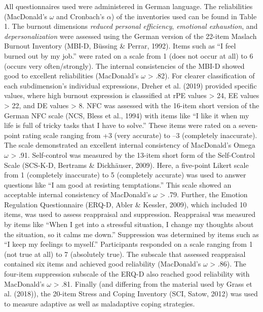\documentclass[
  man]{apa6}
\begin{document}
All questionnaires used were administered in German language.
The reliabilities (MacDonald's \(\omega\) and Cronbach's \(\alpha\)) of the inventories used can be found in Table 1.
The burnout dimensions \emph{reduced personal efficiency}, \emph{emotional exhaustion}, and \emph{depersonalization} were assessed using the German version of the 22-item Maslach Burnout Inventory (MBI-D, Büssing \& Perrar, 1992).
Items such as ``I feel burned out by my job.'' were rated on a scale from 1 (does not occur at all) to 6 (occurs very often/strongly).
The internal consistencies of the MBI-D showed good to excellent reliabilities (MacDonald's \(\omega\) \textgreater{} .82).
For clearer classification of each subdimension's individual expressions, Dreher et al. (2019) provided specific values, where high burnout expression is classsified at rPE values \textgreater{} 24, EE values \textgreater{} 22, and DE values \textgreater{} 8.
NFC was assessed with the 16-item short version of the German NFC scale (NCS, Bless et al., 1994) with items like ``I like it when my life is full of tricky tasks that I have to solve.'' These items were rated on a seven-point rating scale ranging from +3 (very accurate) to --3 (completely inaccurate).
The scale demonstrated an excellent internal consistency of MacDonald's Omega \(\omega\) \textgreater{} .91.
Self-control was measured by the 13-item short form of the Self-Control Scale (SCS-K-D, Bertrams \& Dickhäuser, 2009).
Here, a five-point Likert scale from 1 (completely inaccurate) to 5 (completely accurate) was used to answer questions like ``I am good at resisting temptations.''
This scale showed an acceptable internal consistency of MacDonald's \(\omega\) \textgreater{} .79.
Further, the Emotion Regulation Questionnaire (ERQ-D, Abler \& Kessler, 2009), which included 10 items, was used to assess reappraisal and suppression. Reappraisal was measured by items like ``When I get into a stressful situation, I change my thoughts about the situation, so it calms me down.''
Suppression was determined by items such as ``I keep my feelings to myself.''
Participants responded on a scale ranging from 1 (not true at all) to 7 (absolutely true).
The subscale that assessed reappraisal contained six items and achieved good reliability (MacDonald's \(\omega\) \textgreater{} .86).
The four-item suppression subscale of the ERQ-D also reached good reliability with MacDonald's \(\omega\) \textgreater{} .81.
Finally (and differing from the material used by Grass et al. (2018)), the 20-item Stress and Coping Inventory (SCI, Satow, 2012) was used to measure adaptive as well as maladaptive coping strategies.
\end{document}
